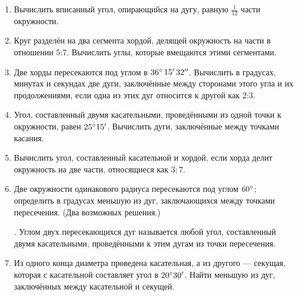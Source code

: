 {\begin{enumerate}

\item
Вычислить вписанный угол, опирающийся на дугу, равную $\tfrac1{12}$ части окружности.

\item
Круг разделён на два сегмента хордой, делящей окружность на части в отношении 5:7.
Вычислить углы, которые вмещаются этими сегментами.

\item
Две хорды пересекаются под углом в $36\degree\, 15'\, 32''$.
Вычислить в градусах, минутах и секундах две дуги, заключённые между сторонами этого угла и их продолжениями, если одна из этих дуг относится к другой как 2:3.

\item
Угол, составленный двумя касательными, проведёнными из одной точки к окружности, равен $25\degree15'$.
Вычислить дуги, заключённые между точками касания.

\item
Вычислить угол, составленный касательной и хордой, если хорда делит окружность на две части, относящиеся как $3:7$.

\item
Две окружности одинакового радиуса пересекаются под углом $60\degree$;
определить в градусах меньшую из дуг, заключающихся между точками пересечения. (Два возможных решения.)

\smallskip
{}.
Углом двух пересекающихся дуг называется любой угол, составленный двумя касательными, проведёнными к этим дугам из точки пересечения.

\item
Из одного конца диаметра проведена касательная, а из другого — секущая, которая с касательной составляет угол в $20\degree 30'$.
Найти меньшую из дуг, заключённых между касательной и секущей.

\end{enumerate}

}
